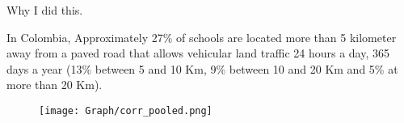 \documentclass[9pt]{beamer}
\begin{document}
\begin{frame}{Why I did this.}

\justifying \small
In Colombia, Approximately  27\% of schools are located more than 5 kilometer away from a paved road that allows vehicular land traffic 24 hours a day, 365 days a year (13\% between 5 and 10 Km, 9\% between 10 and 20 Km and 5\% at more than 20 Km). 

\begin{figure}[h!]
    \centering
    \renewcommand\thefigure{4.1}
     \texttt{[image: Graph/corr\_pooled.png]}
    \caption{} \label{fig:Figdispertion}
\end{figure}
     
\end{frame}



         



\end{document}
